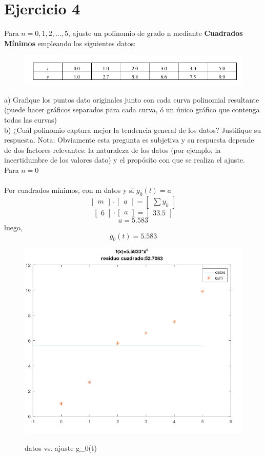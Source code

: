 \documentclass{article}
\begin{document}
\section{Ejercicio 4}
Para $n = 0, 1, 2, \dots, 5$, ajuste un polinomio de grado n mediante \textbf{Cuadrados Mínimos} empleando los siguientes datos: 

\begin{figure}[H]
    \centering
    \includegraphics[width=1\linewidth]{ej4_c.png}
    \label{fig:enter-label}
\end{figure}

a) Grafique los puntos dato originales junto con cada curva polinomial resultante (puede hacer
gráficos separados para cada curva, ó un único gráfico que contenga todas las curvas)\\
b) ¿Cuál polinomio captura mejor la tendencia general de los datos? Justifique su respuesta.
Nota: Obviamente esta pregunta es subjetiva y su respuesta depende de dos factores relevantes:
la naturaleza de los datos (por ejemplo, la incertidumbre de los valores dato) y el propósito con
que se realiza el ajuste.\\

Para $n=0$\\\\
Por cuadrados mínimos, con m datos y si 
$g_0(t)=a$ 
\[
\begin{bmatrix}
    m
\end{bmatrix}
\cdot
\begin{bmatrix}
    a
\end{bmatrix}
=
\begin{bmatrix}
    \sum{y_k}
\end{bmatrix}
\]
\[
\begin{bmatrix}
    6
\end{bmatrix}
\cdot
\begin{bmatrix}
    a
\end{bmatrix}
=
\begin{bmatrix}
    33.5
\end{bmatrix}
\]
\[a = 5.583\]
luego,
\[g_0(t)=5.583\]

\begin{figure}[H]
    \centering
    \includegraphics[width=0.6\linewidth]{grado.0.png}
    \label{fig:enter-label}
    \caption{datos vs. ajuste g_0(t)}
\end{figure}
\end{document}
